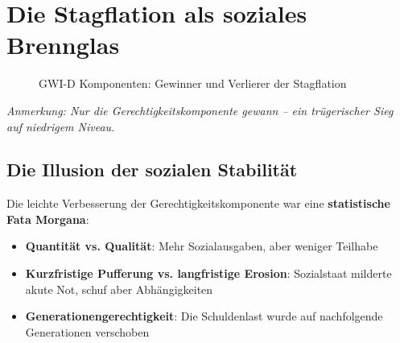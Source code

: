 \section{Die Stagflation als soziales Brennglas}

\begin{figure}[ht]
    \centering
    \caption{GWI-D Komponenten: Gewinner und Verlierer der Stagflation}
    \label{fig:gewinner_verlierer}
\end{figure}

\begin{flushleft}
\footnotesize{\textit{Anmerkung: Nur die Gerechtigkeitskomponente gewann – ein trügerischer Sieg auf niedrigem Niveau.}}
\end{flushleft}

\subsection{Die Illusion der sozialen Stabilität}

Die leichte Verbesserung der Gerechtigkeitskomponente war eine \textbf{statistische Fata Morgana}:

\begin{itemize}
    \item \textbf{Quantität vs. Qualität}: Mehr Sozialausgaben, aber weniger Teilhabe
    \item \textbf{Kurzfristige Pufferung vs. langfristige Erosion}: Sozialstaat milderte akute Not, schuf aber Abhängigkeiten
    \item \textbf{Generationengerechtigkeit}: Die Schuldenlast wurde auf nachfolgende Generationen verschoben
\end{itemize}

